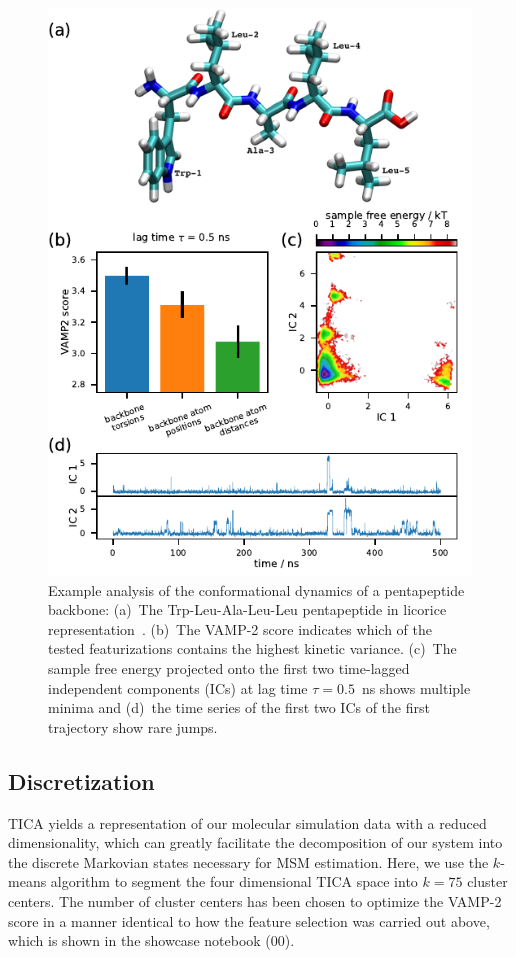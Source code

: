 \documentclass[9pt,tutorial]{livecoms}
\begin{document}
\begin{figure}
\includegraphics{figure_3}
\caption{Example analysis of the conformational dynamics of a pentapeptide backbone:
(a)~The Trp-Leu-Ala-Leu-Leu pentapeptide in licorice representation~\cite{vmd}.
(b)~The VAMP-2 score indicates which of the tested featurizations contains the highest kinetic variance.
(c)~The sample free energy projected onto the first two time-lagged independent components (ICs) at lag time $\tau=0.5$~ns shows multiple minima and
(d)~the time series of the first two ICs of the first trajectory show rare jumps.}
\label{fig:io-to-tica}
\end{figure}

\subsection{Discretization}

TICA yields a representation of our molecular simulation data with a reduced dimensionality,
which can greatly facilitate the decomposition of our system into the discrete Markovian states necessary for MSM estimation.
Here, we use the $k$-means algorithm to segment the four dimensional TICA space into $k=75$ cluster centers.
The number of cluster centers has been chosen to optimize the VAMP-2 score in a manner identical to how the feature selection was carried out above,
which is shown in the showcase notebook (00).
\end{document}
